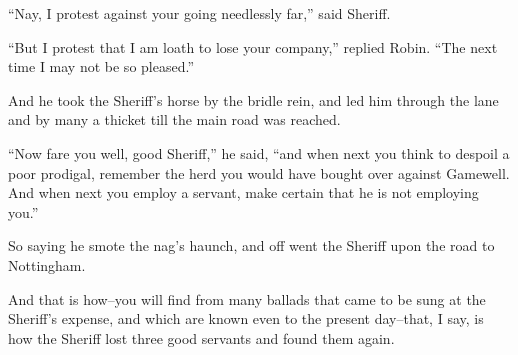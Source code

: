 ``Nay, I protest against your going needlessly far,'' said Sheriff.

``But I protest that I am loath to lose your company,'' replied Robin.
``The next time I may not be so pleased.''

And he took the Sheriff's horse by the bridle rein, and led him through
the lane and by many a thicket till the main road was reached.

``Now fare you well, good Sheriff,'' he said, ``and when next you think
to despoil a poor prodigal, remember the herd you would have bought over
against Gamewell. And when next you employ a servant, make certain that
he is not employing you.''

So saying he smote the nag's haunch, and off went the Sheriff upon the
road to Nottingham.

And that is how--you will find from many ballads that came to be sung at
the Sheriff's expense, and which are known even to the present
day--that, I say, is how the Sheriff lost three good servants and found
them again.
